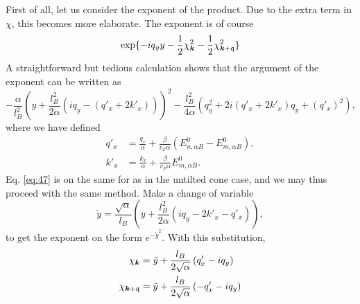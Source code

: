 First of all, let us consider the exponent of the product.
Due to the extra term in \(\chi\), this becomes more elaborate.
The exponent is of course
\begin{equation}
  \label{eq:46}
  \exp\{-i q_{y} y - \frac{1}{2} \chi_{\bm{k}} ^2 - \frac{1}{2} \chi _{\bm{k} + \mathfrak{q}}^2\}
\end{equation}
A straightforward but tedious calculation shows that the argument of the exponent can be written as
\begin{equation}
  \label{eq:47}
  -\frac{\alpha}{l_{B}^2} \left(y + \frac{l_{B}^2}{2 \alpha } (i q_{y} - (q'_x + 2 k'_x))\right)^2
  -\frac{l_{B}^2}{4 \alpha } (q_{y}^2 + 2i (q'_x + 2 k'_x) q_{y} + ( q' _{x} )^2 ),
\end{equation}
where we have defined
\begin{align}
  q' _x &= \frac{q_x}{\alpha } + \frac{\beta}{v_{F} \alpha }( E^0_{n,\alpha B} - E^0_{m, \alpha B} ),\\
  k' _x &= \frac{k_x}{\alpha } + \frac{\beta}{v_F \alpha } E^0_{m, \alpha B}.
\end{align}
Eq. \eqref{eq:47} is on the same for as in the untilted cone case, and we may thus proceed with the same method.
Make a change of variable
\[
\tilde{y} = \frac{\sqrt{\alpha }}{l_{B}} \left(y + \frac{l_{B}^2}{2\alpha } (iq_{y} - 2 k' _x - q' _x )\right),
\]
to get the exponent on the form \(e^{-\tilde{y}^2}\).
With this substitution,
\begin{align}
  \chi _{\bm{k}} &= \tilde{y} + \frac{l_{B}}{2 \sqrt{\alpha }} \left(q' _x - i q_{y}\right)\\
  \chi _{\bm{k} + \mathfrak{q}} &= \tilde{y} + \frac{l_{B}}{2 \sqrt{\alpha }} \left(- q' _x - i q_{y}\right)
\end{align}

